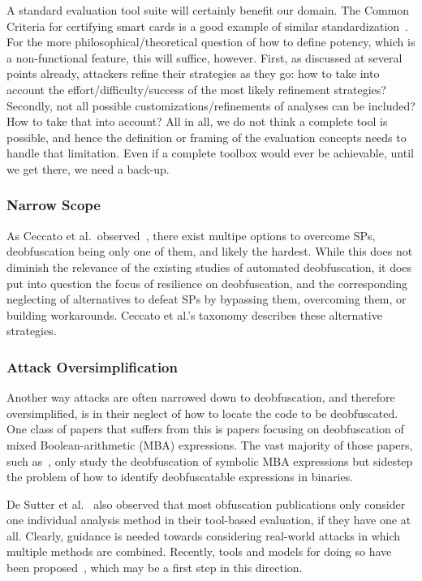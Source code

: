 A standard evaluation tool suite will certainly benefit our domain. The Common Criteria for certifying smart cards is a good example of similar standardization~\cite{common_criteria}. For the more philosophical/theoretical question of how to define potency, which is a non-functional feature, this will suffice, however. First, as discussed at several points already, attackers refine their strategies as they go: how to take into account the effort/difficulty/success of the most likely refinement strategies? Secondly, not all possible customizations/refinements of analyses can be included? How to take that into account? All in all, we do not think a complete tool is possible, and hence the definition or framing of the evaluation concepts needs to handle that limitation. Even if a complete toolbox would ever be achievable, until we get there, we need a back-up.
  
\subsubsection{Narrow Scope}
As Ceccato et al.\ observed~\cite{emse2019}, there exist multipe options to overcome SPs, deobfuscation being only one of them, and likely the hardest. While this does not diminish the relevance of the existing studies of automated deobfuscation, it does put into question the focus of resilience on deobfuscation, and the corresponding neglecting of alternatives to defeat SPs by bypassing them, overcoming them, or building workarounds. Ceccato et al.'s taxonomy describes these alternative strategies.

\subsubsection{Attack Oversimplification}
Another way attacks are often narrowed down to deobfuscation, and therefore oversimplified, is in their neglect of how to locate the code to be deobfuscated. One class of papers that suffers from this is papers focusing on deobfuscation of mixed Boolean-arithmetic (MBA) expressions. The vast majority of those papers, such as~\cite{2021_mba_blast_unveiling_and_simplifying_mixed_boolean_arithmetic_obfuscation}, only study the deobfuscation of symbolic MBA expressions but sidestep the problem of how to identify deobfuscatable expressions in binaries.

De Sutter et al.~\cite{desutter2024evaluation} also observed that most obfuscation publications only consider one individual analysis method in their tool-based evaluation, if they have one at all. Clearly, guidance is needed towards considering real-world attacks in which multiple methods are combined. Recently, tools and models for doing so have been proposed~\cite{checkmate24}, which may be a first step in this direction. 

